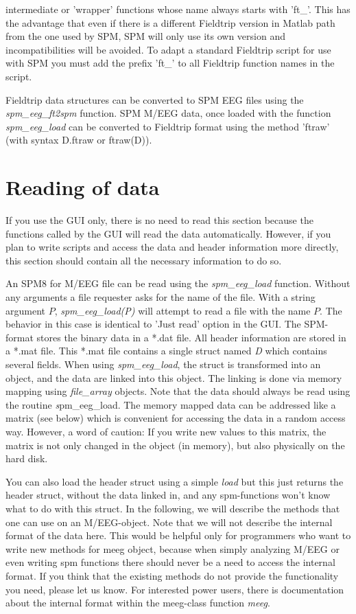 intermediate or 'wrapper' functions whose name always starts with
'ft\_'. This has the advantage that even if there is a different Fieldtrip
version in Matlab path from the one used by SPM, SPM will only use its own
version and incompatibilities will be avoided. To adapt a standard
Fieldtrip script for use with SPM you must add the prefix 'ft\_' 
to all Fieldtrip function names in the script.

Fieldtrip data structures can be converted to SPM EEG files using
the \textit{spm\_eeg\_ft2spm} function.  SPM M/EEG data, once loaded
with the function \textit{spm\_eeg\_load} can be converted to Fieldtrip
format using the method 'ftraw' (with syntax D.ftraw or ftraw(D)).

\section{Reading of data}
\label{sec:load}
If you use the GUI only, there is no need to read this
section because the functions called by the GUI will read the data
automatically. However, if you plan to write scripts and access the
data and header information more directly, this section should contain
all the necessary information to do so. 

An SPM8 for M/EEG file can be read using the \textit{spm\_eeg\_load}
function. Without any arguments a file requester asks for the name of
the file. With a string argument $P$, \textit{spm\_eeg\_load(P)} will
attempt to read a file with the name $P$. The behavior in this case is
identical to 'Just read' option in the GUI. The SPM-format stores the
binary data in a *.dat file. All header information are stored in a
*.mat file. This *.mat file contains a single struct named {\textit D}
which contains several fields. When using \textit{spm\_eeg\_load}, the
struct is transformed into an object, and the data are linked into this
object. The linking is done via memory mapping using \textit{file\_array}
objects. Note that the data should always be read using the routine 
{\textit spm\_eeg\_load}. The memory mapped data can be
addressed like a matrix (see below) which is convenient for accessing
the data in a random access way. However, a word of caution: If you
write new values to this matrix, the matrix is not only changed
in the object (in memory), but also physically on the hard
disk.  

You can also load the header struct using a
simple \textit{load} but this just returns the header struct, without the
data linked in, and any spm-functions won't know what to do with this
struct.  In the following, we will describe the methods
that one can use on an M/EEG-object. Note that we will not describe
the internal format of the data here. This would be helpful only for
programmers who want to write new methods for meeg object, because when simply
analyzing M/EEG or even writing spm functions there should never be a need
to access the internal format. If you think that the existing methods do not
provide the functionality you need, please let us know. For interested power users,
there is documentation about the internal format within the meeg-class function 
\textit{meeg}. 

